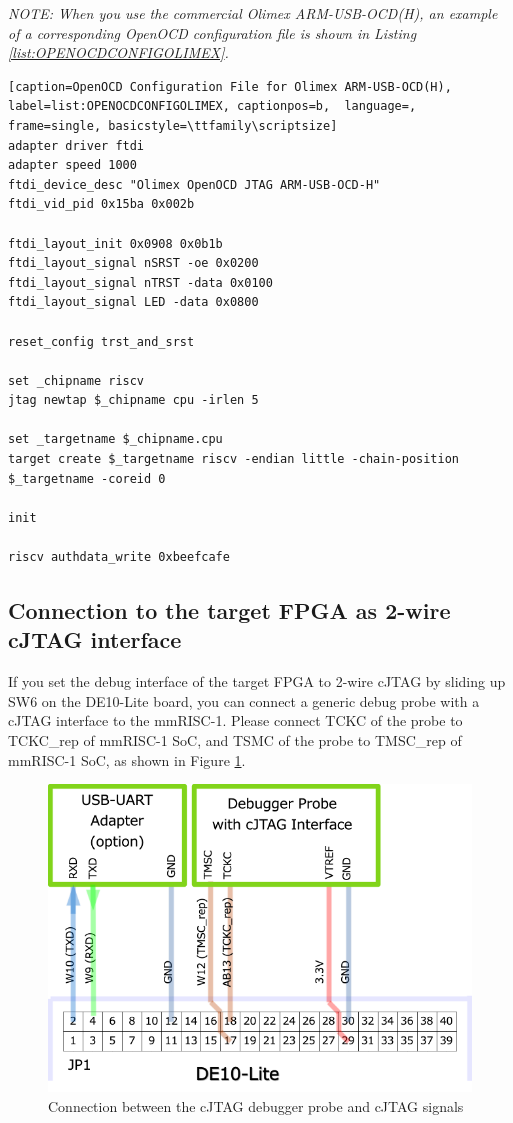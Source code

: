 \textit{NOTE: When you use the commercial Olimex ARM-USB-OCD(H), an example of a corresponding OpenOCD configuration file is shown in Listing \ref{list:OPENOCDCONFIGOLIMEX}.}

\begin{lstlisting}[caption=OpenOCD Configuration File for Olimex ARM-USB-OCD(H), label=list:OPENOCDCONFIGOLIMEX, captionpos=b,  language=, frame=single, basicstyle=\ttfamily\scriptsize]
adapter driver ftdi
adapter speed 1000
ftdi_device_desc "Olimex OpenOCD JTAG ARM-USB-OCD-H"
ftdi_vid_pid 0x15ba 0x002b

ftdi_layout_init 0x0908 0x0b1b
ftdi_layout_signal nSRST -oe 0x0200
ftdi_layout_signal nTRST -data 0x0100
ftdi_layout_signal LED -data 0x0800

reset_config trst_and_srst

set _chipname riscv
jtag newtap $_chipname cpu -irlen 5

set _targetname $_chipname.cpu
target create $_targetname riscv -endian little -chain-position $_targetname -coreid 0

init

riscv authdata_write 0xbeefcafe
\end{lstlisting}


\subsection{Connection to the target FPGA as 2-wire cJTAG interface}

If you set the debug interface of the target FPGA to 2-wire cJTAG by sliding up SW6 on the DE10-Lite board, you can connect a generic debug probe with a cJTAG interface to the mmRISC-1. Please connect TCKC of the probe to TCKC\_rep of mmRISC-1 SoC, and TSMC of the probe to TMSC\_rep of mmRISC-1 SoC, as shown in Figure \ref{fig:CONNECTIONCJTAGPROBE}.

\begin{figure}[H]
    \includegraphics[width=0.8\columnwidth]{./Figure/Connection_cJTAG_Probe.png}
    \caption{Connection between the cJTAG debugger probe and cJTAG signals}
    \label{fig:CONNECTIONCJTAGPROBE}
\end{figure}

